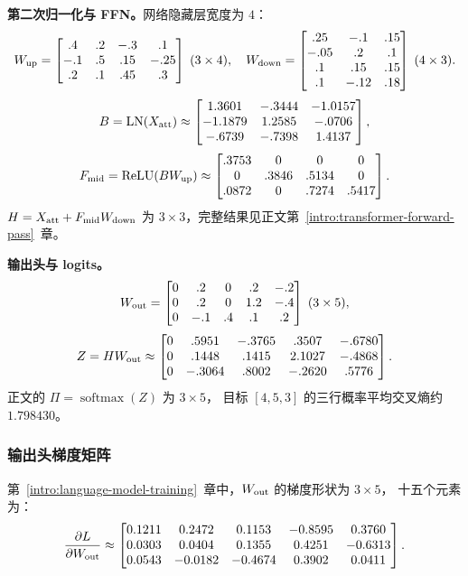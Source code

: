 \textbf{第二次归一化与 FFN。}网络隐藏层宽度为 $4$：
\[
W_{\rm up}=\begin{bmatrix}
.4&.2&-.3&.1\\
-.1&.5&.15&-.25\\
.2&.1&.45&.3
\end{bmatrix}\;(3\times4),
\quad
W_{\rm down}=\begin{bmatrix}
.25&-.1&.15\\
-.05&.2&.1\\
.1&.15&.15\\
.1&-.12&.18
\end{bmatrix}\;(4\times3).
\]
\[
B=\operatorname{LN}(X_{\rm att})\approx
\begin{bmatrix}
1.3601&-.3444&-1.0157\\
-1.1879&1.2585&-.0706\\
-.6739&-.7398&1.4137
\end{bmatrix},
\]
\[
F_{\rm mid}=\operatorname{ReLU}(BW_{\rm up})\approx
\begin{bmatrix}
.3753&0&0&0\\
0&.3846&.5134&0\\
.0872&0&.7274&.5417
\end{bmatrix}.
\]
$H=X_{\rm att}+F_{\rm mid}W_{\rm down}$ 为 $3\times3$，完整结果见正文第~\ref*{intro:transformer-forward-pass}~章。

\textbf{输出头与 logits。}
\[
W_{\rm out}=\begin{bmatrix}
0&.2&0&.2&-.2\\
0&.2&0&1.2&-.4\\
0&-.1&.4&.1&.2
\end{bmatrix}\;(3\times5),
\]
\[
Z=HW_{\rm out}\approx
\begin{bmatrix}
0&.5951&-.3765&.3507&-.6780\\
0&.1448&.1415&2.1027&-.4868\\
0&-.3064&.8002&-.2620&.5776
\end{bmatrix}.
\]
正文的 $\Pi=\operatorname{softmax}(Z)$ 为 $3\times5$，
目标 $[4,5,3]$ 的三行概率平均交叉熵约 $1.798430$。

\subsubsection*{输出头梯度矩阵}
第~\ref*{intro:language-model-training}~章中，$W_{\rm out}$ 的梯度形状为 $3\times5$，
十五个元素为：
\[
\frac{\partial L}{\partial W_{\rm out}}
\approx\begin{bmatrix}
0.1211&0.2472&0.1153&-0.8595&0.3760\\
0.0303&0.0404&0.1355&0.4251&-0.6313\\
0.0543&-0.0182&-0.4674&0.3902&0.0411
\end{bmatrix}.
\]


